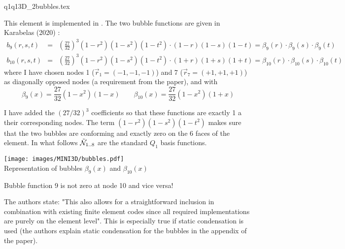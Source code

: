 \begin{flushright} {\tiny {\color{gray} q1q13D\_2bubbles.tex}} \end{flushright}

This element is implemented in .
The two bubble functions are given in Karabelas \etal (2020) \cite{kahp20}:
\begin{eqnarray}
b_9(r,s,t) &=& \left(\frac{27}{32}\right)^3 (1-r^2)(1-s^2)(1-t^2) \cdot (1-r)(1-s)(1-t) 
= \beta_9(r)\cdot\beta_9(s) \cdot \beta_9(t) \nonumber\\
b_{10}(r,s,t) &=& \left(\frac{27}{32}\right)^3 (1-r^2)(1-s^2)(1-t^2) \cdot (1+r)(1+s)(1+t) 
= \beta_{10}(r)\cdot\beta_{10}(s) \cdot \beta_{10}(t)  \nonumber
\end{eqnarray}
where I have chosen nodes 1 ($\vec{r}_1=(-1,-1,-1)$) and 7 ($\vec{r}_7=(+1,+1,+1)$) 
as diagonally opposed nodes (a requirement from the paper), 
and with
\[
\beta_9(x)=\frac{27}{32} (1-x^2) (1-x)
\qquad
\beta_{10}(x)=\frac{27}{32} (1-x^2) (1+x)
\]

I have added the $(27/32)^3$ coefficients so that these functions are exactly 1 a their 
corresponding nodes.
The term $(1-r^2)(1-s^2)(1-t^2)$ makes sure that the two bubbles are conforming and exactly zero 
on the 6 faces of the element.
In what follows $\tilde{{\mathcal{N}}}_{1..8}$ are the standard $Q_1$ basis functions.

\begin{center}
\texttt{[image: images/MINI3D/bubbles.pdf]}\\
{\captionfont Representation of bubbles $\beta_9(x)$ and $\beta_{10}(x)$}
\end{center}

\begin{remark}
Bubble function 9 is not zero at node 10 and vice versa!
\end{remark}

The authors state: "This also allows for a straightforward inclusion in combination 
with existing finite element codes since all required
implementations are purely on the element level". This is especially true 
if static condensation is used (the authors explain static condensation 
for the bubbles in the appendix of the paper).

